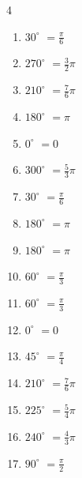 \begin{multicols}{4}
\begin{enumerate}
  \item $\displaystyle 30^{\circ}$
        $\displaystyle =\frac{\pi}{6}$

  \item $\displaystyle 270^{\circ}$
        $\displaystyle =\frac{3}{2}\pi$

  \item $\displaystyle 210^{\circ}$
        $\displaystyle =\frac{7}{6}\pi$

  \item $\displaystyle 180^{\circ}$
        $\displaystyle =\pi$

  \item $\displaystyle 0^{\circ}$
        $\displaystyle =0$

  \item $\displaystyle 300^{\circ}$
        $\displaystyle =\frac{5}{3}\pi$

  \item $\displaystyle 30^{\circ}$
        $\displaystyle =\frac{\pi}{6}$

  \item $\displaystyle 180^{\circ}$
        $\displaystyle =\pi$

  \item $\displaystyle 180^{\circ}$
        $\displaystyle =\pi$

  \item $\displaystyle 60^{\circ}$
        $\displaystyle =\frac{\pi}{3}$

  \item $\displaystyle 60^{\circ}$
        $\displaystyle =\frac{\pi}{3}$

\columnbreak %

  \item $\displaystyle 0^{\circ}$
        $\displaystyle =0$

  \item $\displaystyle 45^{\circ}$
        $\displaystyle =\frac{\pi}{4}$

  \item $\displaystyle 210^{\circ}$
        $\displaystyle =\frac{7}{6}\pi$

  \item $\displaystyle 225^{\circ}$
        $\displaystyle =\frac{5}{4}\pi$

  \item $\displaystyle 240^{\circ}$
        $\displaystyle =\frac{4}{3}\pi$

  \item $\displaystyle 90^{\circ}$
        $\displaystyle =\frac{\pi}{2}$


\end{enumerate}
\end{multicols}
